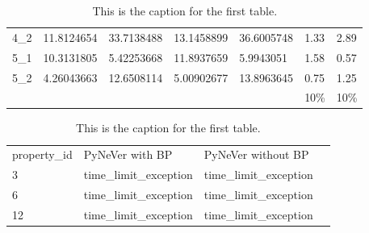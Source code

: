 \begin{table}[]
{\begin{tabular}{lllllll}
    4\_2                        & {\color[HTML]{ACB9CA} 11.8124654} & {\color[HTML]{ACB9CA} 33.7138488} & {\color[HTML]{ACB9CA} 13.1458899} & {\color[HTML]{ACB9CA} 36.6005748} & {\color[HTML]{ACB9CA} 1.33} & {\color[HTML]{ACB9CA} 2.89} \\
    5\_1                        & {\color[HTML]{ACB9CA} 10.3131805} & {\color[HTML]{ACB9CA} 5.42253668} & {\color[HTML]{ACB9CA} 11.8937659} & {\color[HTML]{ACB9CA} 5.9943051}  & {\color[HTML]{ACB9CA} 1.58} & {\color[HTML]{ACB9CA} 0.57} \\
    5\_2                        & {\color[HTML]{ACB9CA} 4.26043663} & {\color[HTML]{ACB9CA} 12.6508114} & {\color[HTML]{ACB9CA} 5.00902677} & {\color[HTML]{ACB9CA} 13.8963645} & {\color[HTML]{ACB9CA} 0.75} & {\color[HTML]{ACB9CA} 1.25} \\\cmidrule(r){1-7}
                                &                                   &                                   &                                   &                                   & {\color[HTML]{FF0000} 10\%} & {\color[HTML]{FF0000} 10\%} \\\cmidrule(r){1-7}      
    \end{tabular}%
    }
    \caption{This is the caption for the first table.}
    \label{table:ACAS}
    \end{table}


\begin{table}[]
    \centering
    \begin{tabular}{@{}llll@{}}
    \toprule
    property\_id & PyNeVer with BP                               & PyNeVer without BP                            &  \\ \cmidrule(r){1-3}
    3            & {\color[HTML]{ACB9CA} time\_limit\_exception} & {\color[HTML]{ACB9CA} time\_limit\_exception} &  \\
    6            & {\color[HTML]{ACB9CA} time\_limit\_exception} & {\color[HTML]{ACB9CA} time\_limit\_exception} &  \\
    12           & {\color[HTML]{ACB9CA} time\_limit\_exception} & {\color[HTML]{ACB9CA} time\_limit\_exception} &  \\ \cmidrule(r){1-3}
    \end{tabular}%
    \caption{This is the caption for the first table.}
    \label{table:DUBINS}
\end{table}


